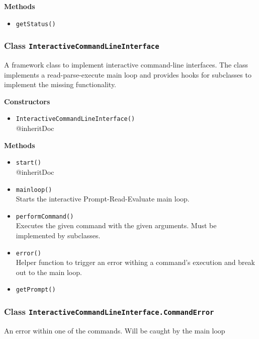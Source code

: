 \textbf{Methods}
\begin{itemize}
\item \lstinline|getStatus()| \\


\end{itemize}

\subsubsection{Class \lstinline|InteractiveCommandLineInterface|}
A framework class to implement interactive command-line interfaces. The class implements
 a read-parse-execute main loop and provides hooks for subclasses to implement the missing
 functionality.

\textbf{Constructors}
\begin{itemize}
\item \lstinline|InteractiveCommandLineInterface()| \\
{@inheritDoc}

\end{itemize}

\textbf{Methods}
\begin{itemize}
\item \lstinline|start()| \\
{@inheritDoc}

\item \lstinline|mainloop()| \\
Starts the interactive Prompt-Read-Evaluate main loop.

\item \lstinline|performCommand()| \\
Executes the given command with the given arguments. Must be implemented by subclasses.

\item \lstinline|error()| \\
Helper function to trigger an error withing a command's execution and break out to
 the main loop.

\item \lstinline|getPrompt()| \\


\end{itemize}

\subsubsection{Class \lstinline|InteractiveCommandLineInterface.CommandError|}
An error within one of the commands. Will be caught by the main loop

